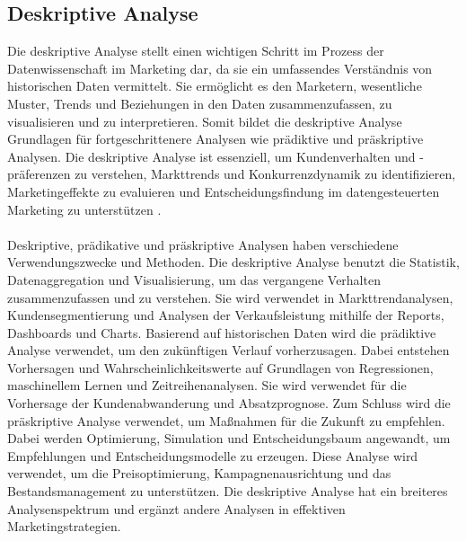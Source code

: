 \subsection{Deskriptive Analyse}
\label{deskriptiveanalyse}
Die deskriptive Analyse stellt einen wichtigen Schritt im Prozess der Datenwissenschaft im Marketing dar, da sie ein umfassendes Verständnis von historischen Daten vermittelt. Sie ermöglicht es den Marketern, wesentliche Muster, Trends und Beziehungen in den Daten zusammenzufassen, zu visualisieren und zu interpretieren. Somit bildet die deskriptive Analyse Grundlagen für fortgeschrittenere Analysen wie prädiktive und präskriptive Analysen. Die deskriptive Analyse ist essenziell, um Kundenverhalten und -präferenzen zu verstehen, Markttrends und Konkurrenzdynamik zu identifizieren, Marketingeffekte zu evaluieren und Entscheidungsfindung im datengesteuerten Marketing zu unterstützen \cite{brown2024mastering}. \\\\
Deskriptive, prädikative und präskriptive Analysen haben verschiedene Verwendungszwecke und Methoden. Die deskriptive Analyse benutzt die Statistik, Datenaggregation und Visualisierung, um das vergangene Verhalten zusammenzufassen und zu verstehen. Sie wird verwendet in Markttrendanalysen, Kundensegmentierung und Analysen der Verkaufsleistung mithilfe der Reports, Dashboards und Charts. Basierend auf historischen Daten wird die prädiktive Analyse verwendet, um den zukünftigen Verlauf vorherzusagen. Dabei entstehen Vorhersagen und Wahrscheinlichkeitswerte auf Grundlagen von Regressionen, maschinellem Lernen und Zeitreihenanalysen. Sie wird verwendet für die Vorhersage der Kundenabwanderung und Absatzprognose. Zum Schluss wird die präskriptive Analyse verwendet, um Maßnahmen für die Zukunft zu empfehlen. Dabei werden Optimierung, Simulation und Entscheidungsbaum angewandt, um Empfehlungen und Entscheidungsmodelle zu erzeugen. Diese Analyse wird verwendet, um die Preisoptimierung, Kampagnenausrichtung und das Bestandsmanagement zu unterstützen. Die deskriptive Analyse hat ein breiteres Analysenspektrum und ergänzt andere Analysen in effektiven Marketingstrategien\cite[S. 51 ff]{brown2024mastering}. 


